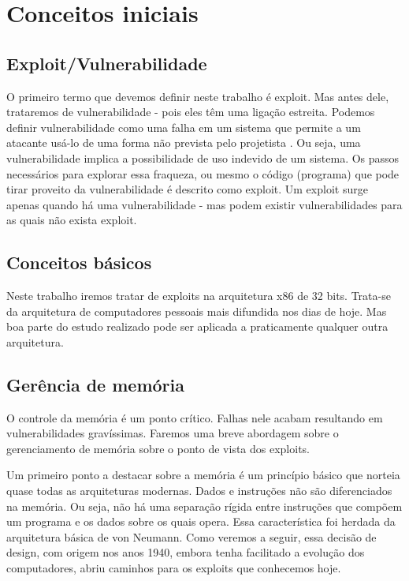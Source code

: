 
\chapter{Conceitos iniciais}
\label{chap:conceitos_iniciais}

	\section{Exploit/Vulnerabilidade}
	O primeiro termo que devemos definir neste trabalho é exploit. Mas antes dele,
	trataremos de vulnerabilidade - pois eles têm uma ligação estreita.
	Podemos definir vulnerabilidade como uma falha em um sistema que permite
	a um atacante usá-lo de uma forma não prevista pelo projetista \cite{Anley2007}.
	Ou seja, uma vulnerabilidade implica a possibilidade de uso indevido de um sistema.
	Os passos necessários para explorar essa fraqueza, ou mesmo o código (programa) que pode tirar
	proveito da vulnerabilidade é descrito como exploit.
	Um exploit surge apenas quando há uma vulnerabilidade - mas podem existir
	vulnerabilidades para as quais não exista exploit.


	\section{Conceitos básicos}
	Neste trabalho iremos tratar de exploits na arquitetura x86 de 32 bits. Trata-se da arquitetura de computadores
	pessoais mais difundida nos dias de hoje. Mas boa parte do estudo realizado pode ser aplicada
	a praticamente qualquer outra arquitetura.

	\section{Gerência de memória}
	O controle da memória é um ponto crítico. Falhas nele acabam resultando em vulnerabilidades 
	gravíssimas. Faremos uma breve abordagem sobre o gerenciamento de memória sobre
	o ponto de vista dos exploits.

	Um primeiro ponto a destacar sobre a memória é um princípio básico que norteia
	quase todas as arquiteturas modernas. Dados e instruções não são diferenciados na memória.
	Ou seja, não há uma separação rígida entre instruções que compõem um programa e os dados
	sobre os quais opera. Essa característica foi herdada da arquitetura básica de von Neumann.
	Como veremos a seguir, essa decisão de design, com origem nos anos 1940, embora tenha
	facilitado a evolução dos computadores, abriu caminhos para os exploits que conhecemos hoje. 

